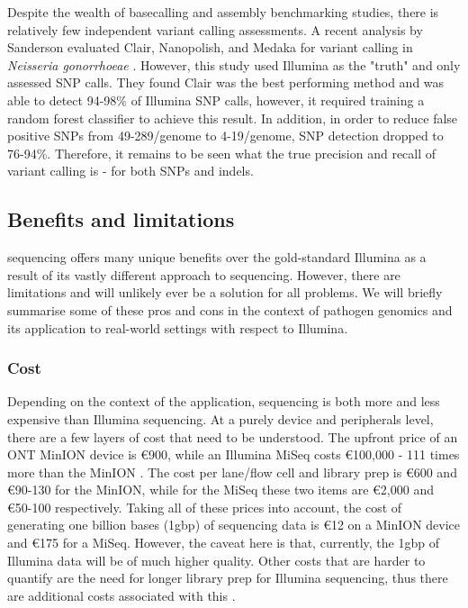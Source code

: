 Despite the wealth of \ont{} basecalling \cite{wick2019} and assembly \cite{wick2020} benchmarking studies, there is relatively few independent variant calling assessments. A recent analysis by Sanderson \etal{} evaluated Clair, Nanopolish, and Medaka for variant calling in \textit{Neisseria gonorrhoeae} \cite{sanderson2020}. However, this study used Illumina as the "truth" and only assessed SNP calls. They found Clair was the best performing method and was able to detect 94-98\% of Illumina SNP calls, however, it required training a random forest classifier to achieve this result. In addition, in order to reduce false positive SNPs from 49-289/genome to 4-19/genome, SNP detection dropped to 76-94\%. Therefore, it remains to be seen what the true precision and recall of \ont{} variant calling is - for both SNPs and indels.

\subsection{Benefits and limitations}

\ont{} sequencing offers many unique benefits over the gold-standard Illumina as a result of its vastly different approach to sequencing. However, there are limitations and \ont{} will unlikely ever be a solution for all problems. We will briefly summarise some of these pros and cons in the context of pathogen genomics and its application to real-world settings with respect to Illumina.

\subsubsection{Cost}
Depending on the context of the application, \ont{} sequencing is both more and less expensive than Illumina sequencing. At a purely device and peripherals level, there are a few layers of cost that need to be understood. The upfront price of an ONT MinION device is \euro900, while an Illumina MiSeq costs \euro100,000 - 111 times more than the MinION \cite{Tedersoo2021}. The cost per lane/flow cell and library prep is \euro600 and \euro90-130 for the MinION, while for the MiSeq these two items are \euro2,000 and \euro50-100 respectively. Taking all of these prices into account, the cost of generating one billion bases (1gbp) of sequencing data is \euro12 on a MinION device and \euro175 for a MiSeq. However, the caveat here is that, currently, the 1gbp of Illumina data will be of much higher quality. Other costs that are harder to quantify are the need for longer library prep for Illumina sequencing, thus there are additional costs associated with this \cite{Tedersoo2021}.

